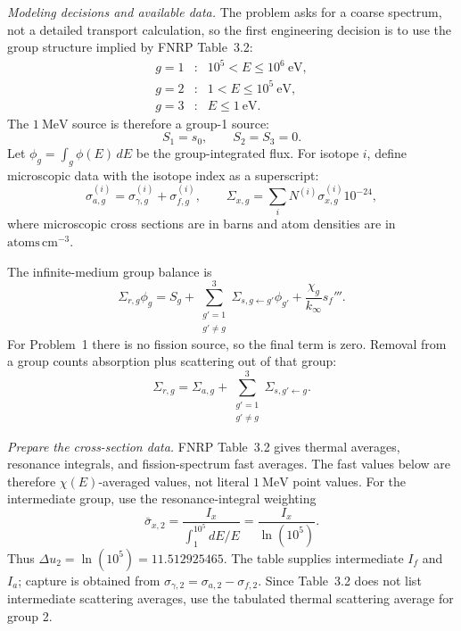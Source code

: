 \begin{adaptedsolution}
\noindent\textit{Modeling decisions and available data.}
The problem asks for a coarse spectrum, not a detailed transport calculation,
so the first engineering decision is to use the group structure implied by
FNRP Table~3.2:
\[
\begin{array}{ccl}
g=1 &:& 10^5 < E \le 10^6~\mathrm{eV},\\
g=2 &:& 1 < E \le 10^5~\mathrm{eV},\\
g=3 &:& E \le 1~\mathrm{eV}.
\end{array}
\]
The $1~\mathrm{MeV}$ source is therefore a group-1 source:
\[
S_1=s_0,\qquad S_2=S_3=0.
\]
Let $\phi_g=\int_g\phi(E)\,dE$ be the group-integrated flux.  For isotope
$i$, define microscopic data with the isotope index as a superscript:
\[
\sigma_{a,g}^{(i)}=\sigma_{\gamma,g}^{(i)}+\sigma_{f,g}^{(i)},
\qquad
\Sigma_{x,g}=\sum_i N^{(i)}\sigma_{x,g}^{(i)}10^{-24},
\]
where microscopic cross sections are in barns and atom densities are in
$\mathrm{atoms\,cm^{-3}}$.

The infinite-medium group balance is
\begin{equation}
\Sigma_{r,g}\phi_g
= S_g
+ \sum_{\substack{g'=1\\g'\ne g}}^3 \Sigma_{s,g\leftarrow g'}\phi_{g'}
+ \frac{\chi_g}{k_\infty}s_f''' .
\label{eq:hw14-general-balance}
\end{equation}
For Problem~1 there is no fission source, so the final term is zero.  Removal
from a group counts absorption plus scattering out of that group:
\[
\Sigma_{r,g}=\Sigma_{a,g}
+\sum_{\substack{g'=1\\g'\ne g}}^3 \Sigma_{s,g'\leftarrow g}.
\]

\noindent\textit{Prepare the cross-section data.}
FNRP Table~3.2 gives thermal averages, resonance integrals, and
fission-spectrum fast averages.  The fast values below are therefore
$\chi(E)$-averaged values, not literal $1~\mathrm{MeV}$ point values.  For
the intermediate group, use the resonance-integral weighting
\[
\bar{\sigma}_{x,2}
=\frac{I_x}{\int_1^{10^5}dE/E}
=\frac{I_x}{\ln(10^5)}.
\]
Thus $\Delta u_2=\ln(10^5)=11.512925465$.  The table supplies intermediate
$I_f$ and $I_a$; capture is obtained from
$\sigma_{\gamma,2}=\sigma_{a,2}-\sigma_{f,2}$.  Since Table~3.2 does not
list intermediate scattering averages, use the tabulated thermal scattering
average for group 2.


\end{adaptedsolution}
